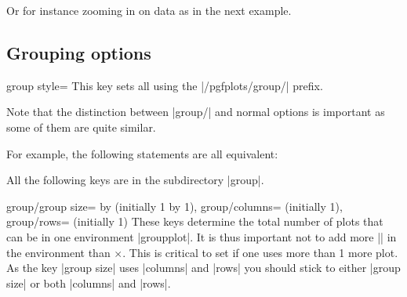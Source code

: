{\begin{command}{\nextgroupplot{} }
Or for instance zooming in on data as in the next example.
\begin{codeexample}[]
\end{codeexample}
\end{command}


\subsection{Grouping options}
\label{sec:pgfplots:group:options}


\begin{pgfplotskey}{group style=}
  This key sets all  using the |/pgfplots/group/| prefix.

  Note that the distinction between |group/| and normal options is important as some of them are quite similar.

   For example, the following statements are all equivalent:
\begin{codeexample}
\pgfplotsset{group/a=2,group/b=3}
\pgfplotsset{group/.cd,a=2,b=3}
\end{codeexample}
\end{pgfplotskey}
All the following keys are in the subdirectory |group|.

\begin{pgfplotskeylist}{group/group size= by  (initially 1 by 1),
      group/columns= (initially 1),
      group/rows= (initially 1)}
  These keys determine the total number of plots that can be in one environment |groupplot|. It is thus important not to add more
  |\nextgroupplot| in the environment than $\times$. This is critical to set if one uses more than 1 more plot. As
  the key |group size| uses |columns| and |rows| you should stick to either |group size| or both |columns| and |rows|.
\end{pgfplotskeylist}

}

